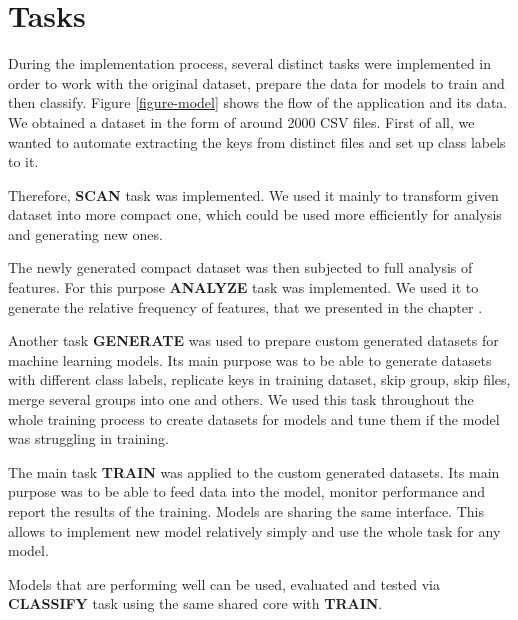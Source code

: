\section{Tasks}

During the implementation process, several distinct tasks were implemented in order to work with the original dataset, prepare the data for models to train and then classify. Figure \ref{figure-model} shows the flow of the application and its data. We obtained a dataset in the form of around 2000 CSV files. First of all, we wanted to automate extracting the keys from distinct files and set up class labels to it. 

Therefore, \textbf{SCAN} task was implemented. We used it mainly to transform given dataset into more compact one, which could be used more efficiently for analysis and generating new ones.

The newly generated compact dataset was then subjected to full analysis of features. For this purpose \textbf{ANALYZE} task was implemented. We used it to generate the relative frequency of features, that we presented in the chapter \label{chapter-analysis}.

Another task \textbf{GENERATE} was used to prepare custom generated datasets for machine learning models. Its main purpose was to be able to generate datasets with different class labels, replicate keys in training dataset, skip group, skip files, merge several groups into one and others. We used this task throughout the whole training process to create datasets for models and tune them if the model was struggling in training.

The main task \textbf{TRAIN} was applied to the custom generated datasets. Its main purpose was to be able to feed data into the model, monitor performance and report the results of the training. Models are sharing the same interface. This allows to implement new model relatively simply and use the whole task for any model.

Models that are performing well can be used, evaluated and tested via \textbf{CLASSIFY} task using the same shared core with \textbf{TRAIN}.

